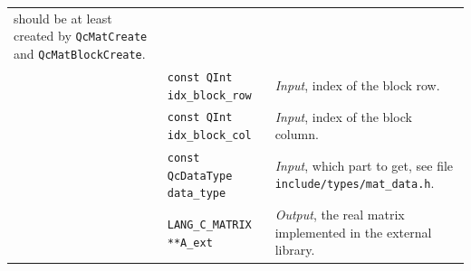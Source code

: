 \documentclass[a4paper,11pt,twoside,openright]{book}
\begin{document}
\begin{center}
\begin{longtable}{p{}|l|p{}}
      should be at least created by \verb|QcMatCreate| and \verb|QcMatBlockCreate|.\\
    & \hspace*{2ex}\verb|const QInt idx_block_row| & \textsl{Input},
      index of the block row.\\
    & \hspace*{2ex}\verb|const QInt idx_block_col| & \textsl{Input},
      index of the block column.\\
    & \hspace*{2ex}\verb|const QcDataType data_type| & \textsl{Input}, which part
      to get, see file \verb|include/types/mat_data.h|.\\
    & \hspace*{2ex}\verb|LANG_C_MATRIX **A_ext| & \textsl{Output}, the real
      matrix implemented in the external library.
  \end{longtable}
\end{center}
\vspace*{-5ex}
\end{document}
